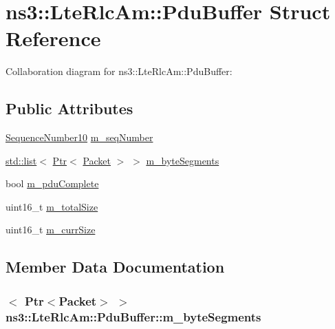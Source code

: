 \hypertarget{structns3_1_1LteRlcAm_1_1PduBuffer}{}\section{ns3\+:\+:Lte\+Rlc\+Am\+:\+:Pdu\+Buffer Struct Reference}
\label{structns3_1_1LteRlcAm_1_1PduBuffer}


Collaboration diagram for ns3\+:\+:Lte\+Rlc\+Am\+:\+:Pdu\+Buffer\+:
\subsection*{Public Attributes}
\begin{DoxyCompactItemize}
\item 
\hyperlink{classns3_1_1SequenceNumber10}{Sequence\+Number10} \hyperlink{structns3_1_1LteRlcAm_1_1PduBuffer_a2828a130f14a8021950834024963f47c}{m\+\_\+seq\+Number}
\item 
\hyperlink{openflow-interface_8h_afd9bcfa176617760671b67580f536fa7}{std\+::list}$<$ \hyperlink{classns3_1_1Ptr}{Ptr}$<$ \hyperlink{classns3_1_1Packet}{Packet} $>$ $>$ \hyperlink{structns3_1_1LteRlcAm_1_1PduBuffer_a1914cd71f65e5e9286c7bb8e4a1e4df2}{m\+\_\+byte\+Segments}
\item 
bool \hyperlink{structns3_1_1LteRlcAm_1_1PduBuffer_a4163ed6cae2b05e428636ede9a435361}{m\+\_\+pdu\+Complete}
\item 
uint16\+\_\+t \hyperlink{structns3_1_1LteRlcAm_1_1PduBuffer_a83a8f271f49f8ae1204e4f9a4231fd4a}{m\+\_\+total\+Size}
\item 
uint16\+\_\+t \hyperlink{structns3_1_1LteRlcAm_1_1PduBuffer_a73c7b8a686180e907a8110e671bf552b}{m\+\_\+curr\+Size}
\end{DoxyCompactItemize}


\subsection{Member Data Documentation}
\subsubsection[{\texorpdfstring{m\+\_\+byte\+Segments}{m_byteSegments}}]{$<$ {\bf Ptr}$<${\bf Packet}$>$ $>$ ns3\+::\+Lte\+Rlc\+Am\+::\+Pdu\+Buffer\+::m\+\_\+byte\+Segments}\hypertarget{structns3_1_1LteRlcAm_1_1PduBuffer_a1914cd71f65e5e9286c7bb8e4a1e4df2}{}\label{structns3_1_1LteRlcAm_1_1PduBuffer_a1914cd71f65e5e9286c7bb8e4a1e4df2}
